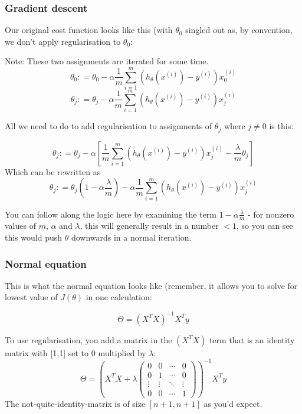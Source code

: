 \subsubsection{Gradient descent}

Our original cost function looks like this (with $\theta_0$ singled out as, by convention, we don't apply regularisation to $\theta_0$:

Note: These two assignments are iterated for some time.
\[
\theta_0 \mathrel{\mathop:}=
\theta_0 - \alpha \frac{1}{m}
\sum_{i=1}^{m}
(h_\theta(x^{(i)}) - y^{(i)})x_0^{(i)}
\]
\[
\theta_j \mathrel{\mathop:}=
\theta_j - \alpha \frac{1}{m}
\sum_{i=1}^{m}
(h_\theta(x^{(i)}) - y^{(i)})x_j^{(i)}
\]

All we need to do to add regularisation to assignments of $\theta_j$ where $j \neq 0$ is this:

\[
\theta_j \mathrel{\mathop:}=
\theta_j - \alpha [\frac{1}{m}
\sum_{i=1}^{m}
(h_\theta(x^{(i)}) - y^{(i)})x_j^{(i)} - \frac{\lambda}{m}\theta_j]
\]
Which can be rewritten as
\[
\theta_j \mathrel{\mathop:}=
\theta_j(1 - \alpha\frac{\lambda}{m})
 - \alpha \frac{1}{m}
\sum_{i=1}^{m}
(h_\theta(x^{(i)}) - y^{(i)})x_j^{(i)}
\]

You can follow along the logic here by examining the term $1 - \alpha\frac{\lambda}{m}$ - for nonzero values of $m$, $\alpha$ and $\lambda$, this will generally result in a number $< 1$, so you can see this would push $\theta$ downwards in a normal iteration.

\subsubsection{Normal equation}

This is what the normal equation looks like (remember, it allows you to solve for lowest value of  $J(\theta)$ in one calculation:

\[
\Theta = (X^TX)^{-1}X^Ty
\]

To use regularisation, you add a matrix in the $(X^TX)$ term that is an identity matrix with [1,1] set to 0 multiplied by $\lambda$:
\[
\Theta = (X^TX + \lambda
\begin{pmatrix}
0 & 0 & \cdots & 0 \\
0 & 1 & \cdots & 0 \\ 
\vdots & \vdots & \ddots & \vdots \\
0 & 0 & \cdots & 1
\end{pmatrix}
 )^{-1}X^Ty
\]
The not-quite-identity-matrix is of size $[n + 1, n + 1]$ as you'd expect.

